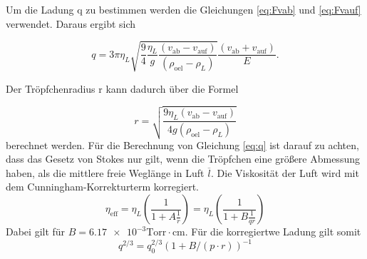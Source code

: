 \noindent Um die Ladung q zu bestimmen werden die Gleichungen \ref{eq:Fvab} und \ref{eq:Fvauf} verwendet.
Daraus ergibt sich

\begin{equation}
    \label{eq:q}
    q = 
    3 \pi \eta_L \sqrt{\frac{9}{4} \frac{\eta_L}{g} \frac{(v_\text{ab} - v_\text{auf})}{(\rho_\text{oel} - \rho_L)}} \frac{(v_\text{ab} + v_\text{auf})}{E}.
\end{equation}

\noindent Der Tröpfchenradius r kann dadurch über die Formel 

\begin{equation}
    \label{eq:r}
    r = \sqrt{\frac{9 \eta_L (v_\text{ab} - v_\text{auf})}{4 g (\rho_\text{oel} - \rho_L)}}
\end{equation}
berechnet werden.
Für die Berechnung von Gleichung \ref{eq:q} ist darauf zu achten, dass das Gesetz von Stokes nur gilt, wenn die Tröpfchen eine größere Abmessung haben, als die 
mittlere freie Weglänge in Luft $\overline{l}$.
Die Viskosität der Luft wird mit dem Cunningham-Korrekturterm korregiert.
\begin{equation}
    \label{eq:nl}
    \eta_\text{eff} = \eta_L (\frac{1}{1 + A \frac{1}{r}}) =  \eta_L (\frac{1}{1 + B \frac{1}{q r}})
\end{equation}
Dabei gilt für $B = \num{6.17 e-3}\text{Torr} \cdot \text{cm} $. 
Für die korregiertwe Ladung gilt somit
\begin{equation}
    \label{eq:qkor}
    q^{2/3} = q_0^{2/3} (1 + B /(p \cdot r))^{-1}
\end{equation}
\cite{sample}
